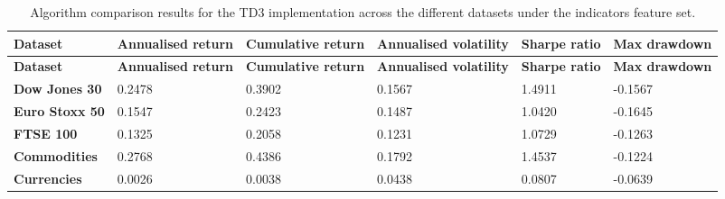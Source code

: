 \begin{longtable}{|l|p{2.1cm}|p{2.1cm}|p{2.1cm}|p{1.5cm}|p{2cm}|}
    \caption{Algorithm comparison results for the TD3 implementation across the different datasets under the indicators feature set.}
    \label{tab:experiment_algorithms_td3}
    \\ 
    \hline
    \textbf{Dataset} & \textbf{Annualised return} & \textbf{Cumulative return} & \textbf{Annualised volatility} & \textbf{Sharpe ratio} & \textbf{Max drawdown}  \\ \midrule
    \endfirsthead

    \hline
    \textbf{Dataset} & \textbf{Annualised return} & \textbf{Cumulative return} & \textbf{Annualised volatility} & \textbf{Sharpe ratio} & \textbf{Max drawdown}  \\ \midrule
    \endhead

    \endfoot
    \hline

    \textbf{Dow Jones 30} & 0.2478 & 0.3902 & 0.1567 & 1.4911 & -0.1567 \\ \hline
    \textbf{Euro Stoxx 50} & 0.1547 & 0.2423 & 0.1487 & 1.0420 & -0.1645 \\ \hline
    \textbf{FTSE 100} & 0.1325 & 0.2058 & 0.1231 & 1.0729 & -0.1263 \\ \hline
    \textbf{Commodities} & 0.2768 & 0.4386 & 0.1792 & 1.4537 & -0.1224 \\ \hline
    \textbf{Currencies} & 0.0026 & 0.0038 & 0.0438 & 0.0807 & -0.0639 \\ \hline
\end{longtable}